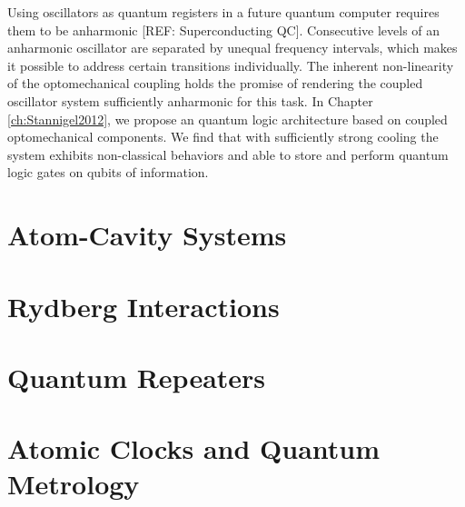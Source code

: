 Using oscillators as quantum registers in a future quantum computer requires
them to be anharmonic [REF: Superconducting QC]. Consecutive levels of an
anharmonic oscillator are separated by unequal frequency intervals, which makes
it possible to address certain transitions individually. The inherent
non-linearity of the optomechanical coupling holds the promise of rendering the
coupled oscillator system sufficiently anharmonic for this task. In Chapter
\ref{ch:Stannigel2012}, we propose an quantum logic architecture based on
coupled optomechanical components. We find that with sufficiently strong cooling
the system exhibits non-classical behaviors and able to store and perform
quantum logic gates on qubits of information.






\section{Atom-Cavity Systems}

\section{Rydberg Interactions}

\section{Quantum Repeaters}

\section{Atomic Clocks and Quantum Metrology}